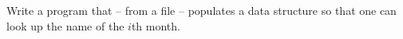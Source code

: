 Write a program that -- from a file -- populates a data structure so that one can look up the name of the $i$th month.
